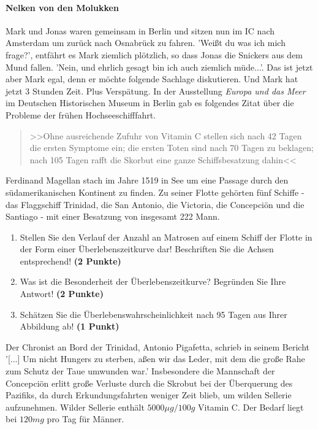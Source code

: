 \documentclass[a4paper, 9pt]{scrartcl}\usepackage[]{graphicx}\usepackage[]{xcolor}
\begin{document}
\paragraph{Nelken von den Molukken}



Mark und Jonas waren gemeinsam in Berlin und sitzen nun im IC nach Amsterdam um zurück nach Osnabrück zu fahren. 'Weißt du was ich mich frage?', entfährt es Mark ziemlich plötzlich, so dass Jonas die Snickers aus dem Mund fallen. 'Nein, und ehrlich gesagt bin ich auch ziemlich müde...'. Das ist jetzt aber Mark egal, denn er möchte folgende Sachlage diskutieren. Und Mark hat jetzt 3 Stunden Zeit. Plus Verspätung. In der Ausstellung \textit{Europa und das Meer} im Deutschen Historischen Museum in Berlin gab es folgendes Zitat über die Probleme der frühen Hochseeschifffahrt.

\begin{quote}
  >>Ohne ausreichende Zufuhr von Vitamin C stellen sich nach 42 Tagen die ersten Symptome ein; die ersten Toten sind nach 70 Tagen zu beklagen; nach 105 Tagen rafft die Skorbut eine ganze Schiffsbesatzung dahin<<
\end{quote}

Ferdinand Magellan stach im Jahre 1519 in See um eine Passage durch den südamerikanischen Kontinent zu finden. Zu seiner Flotte gehörten fünf Schiffe - das Flaggschiff Trinidad, die San Antonio, die Victoria, die Concepciön und die Santiago - mit einer Besatzung von insgesamt 222 Mann. 

\begin{enumerate}
\item Stellen Sie den Verlauf der Anzahl an Matrosen auf einem Schiff der Flotte in der Form einer Überlebenszeitkurve dar! Beschriften Sie die Achsen entsprechend! \textbf{(2 Punkte)} 
\item Was ist die Besonderheit der Überlebenszeitkurve? Begründen Sie Ihre Antwort! \textbf{(2 Punkte)} 
\item Schätzen Sie die Überlebenswahrscheinlichkeit nach 95 Tagen aus Ihrer Abbildung ab! \textbf{(1 Punkt)} 
\end{enumerate}

Der Chronist an Bord der Trinidad, Antonio Pigafetta, schrieb in seinem Bericht '[...] Um nicht Hungers zu sterben, aßen wir das Leder, mit dem die große Rahe zum Schutz der Taue umwunden war.' Insbesondere die Mannschaft der Concepciön erlitt große Verluste durch die Skrobut bei der Überquerung des Pazifiks, da durch Erkundungsfahrten weniger Zeit blieb, um wilden Sellerie aufzunehmen. Wilder Sellerie enthält $5000\mu g/100g$ Vitamin C. Der Bedarf liegt bei $120mg$ pro Tag für Männer.
\end{document}
